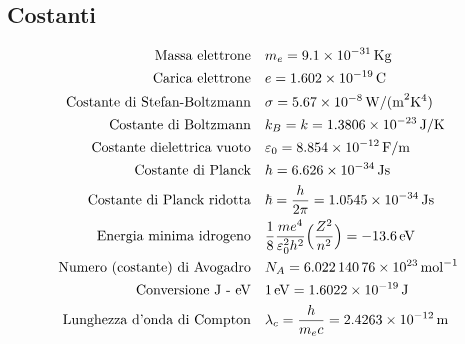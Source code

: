 \subsection{Costanti}
\begin{equation}
\begin{split}
\mbox{Massa elettrone} & \quad m_e = \SI{9.1e-31}{Kg} \\
\mbox{Carica elettrone} & \quad e = \SI{1.602e-19}{C} \\
\mbox{Costante di Stefan-Boltzmann} & \quad \sigma = \SI{5.67e-8}{W / ( m^2 K^4)} \\
\mbox{Costante di Boltzmann} & \quad k_B = k = \SI{1.3806e-23}{J / K} \\
\mbox{Costante dielettrica vuoto} & \quad \varepsilon_0 = \SI{8.854e-12}{F/m} \\
\mbox{Costante di Planck} & \quad h = \SI{6.626e-34}{J s} \\
\mbox{Costante di Planck ridotta} & \quad \hbar = \frac{ h}{2\pi } = \SI{1.0545e-34}{J s} \\
\mbox{Energia minima idrogeno} & \quad \frac{ 1}{8 }\frac{m e^4 }{\varepsilon_0^2 h^2 } \Bigl(  \frac{ Z^2}{n^2 }  \Bigr)= \SI{-13.6e0}{eV} \\
\mbox{Numero (costante) di Avogadro} & \quad N_A = \SI{6.02214076e23}{mol^{-1}} \\
\mbox{Conversione J - eV} & \quad \SI{1 }{eV} = \SI{1.6022e-19}{J} \\
\mbox{Lunghezza d'onda di Compton} & \quad \lambda_c = \frac{ h}{m_e c } = \SI{2.4263e-12}{m} \\
\end{split}
\end{equation}

